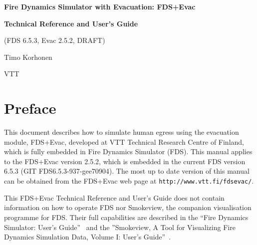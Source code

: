 \documentclass[12pt,a4paper,final,twoside]{stylevk}
\begin{document}
\begin{titlepage}
\begin{center}
    { \normalfont\fontsize{28}{42}\selectfont\bfseries\sffamily
      Fire Dynamics Simulator with Evacuation: FDS+Evac
    }

    \vspace{6mm}

    { \normalfont\fontsize{22}{28}\selectfont\bfseries\sffamily
      Technical Reference and User's Guide }

    { \normalfont\fontsize{14}{18}\selectfont\sffamily
      (FDS 6.5.3, Evac 2.5.2, DRAFT) }

    \vspace{15mm}

    { \normalfont\fontsize{14}{18}\selectfont\sffamily
      Timo Korhonen }

    \vspace{3mm}

    { \normalfont\fontsize{12}{16}\selectfont\sffamily
      VTT}

  \end{center}


\vspace{2cm}
    

\end{titlepage}

\setcounter{page}{4}

\newpage


\chapter*{Preface}

\noindent This document describes how to simulate human egress using
the evacuation module, FDS+Evac, developed at VTT Technical Research
Centre of Finland, which is fully embedded in Fire Dynamics Simulator
(FDS).  This manual applies to the FDS+Evac version 2.5.2, which is
embedded in the current FDS version 6.5.3 (GIT FDS6.5.3-937-gee70904).
The most up to date version of this manual can be obtained from the
FDS+Evac web page at
\texttt{http://www.vtt.fi/}\linebreak[4]\texttt{fdsevac/}.


This FDS+Evac Technical Reference and User's Guide does not contain
information on how to operate FDS nor Smokeview, the companion
visualisation programme for FDS.  Their full capabilities are
described in the ``Fire Dynamics Simulator: User's
Guide''~\cite{FDS_UserGuide} and the ''Smokeview, A Tool for
Visualizing Fire Dynamics Simulation Data,  Volume I: User's
Guide''~\cite{SV_UserGuide}.
\end{document}
